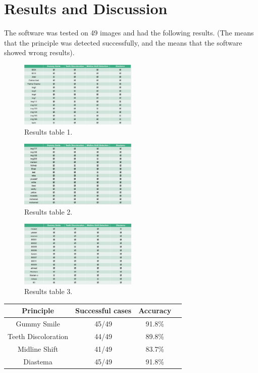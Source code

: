 \documentclass[conference,twocolumn]{IEEEtran}
\begin{document}
\section{Results and Discussion}
The software was tested on 49 images and had the following results. (The \checkmark means that the principle was detected successfully, and the  means that the software showed wrong results).

\begin{figure}[H]
    \centering
    \includegraphics[width=0.5\textwidth]{Screenshot_1.png}
    \caption{Results table 1.}
    \label{fig:my_label}
\end{figure}
\begin{figure}[H]
    \centering
    \includegraphics[width=0.5\textwidth]{Screenshot_2.png}
    \caption{Results table 2.}
    \label{fig:my_label}
\end{figure}
\begin{figure}[H]
    \centering
    \includegraphics[width=0.5\textwidth]{Screenshot_3.png}
    \caption{Results table 3.}
    \label{fig:my_label}
\end{figure}
\begin{center}
\begin{tabular}{||c c c c||} 
 \hline
 Principle & Successful cases & Accuracy \\ [0.5ex] 
 \hline\hline
 Gummy Smile & 45/49 & 91.8\% \\[1ex] 
 \hline
 Teeth Discoloration & 44/49 & 89.8\% \\[1ex] 
 \hline
 Midline Shift & 41/49 & 83.7\% \\[1ex] 
 \hline
 Diastema & 45/49 & 91.8\% \\ [1ex] 
\hline
\end{tabular}
\end{center}
\end{document}
